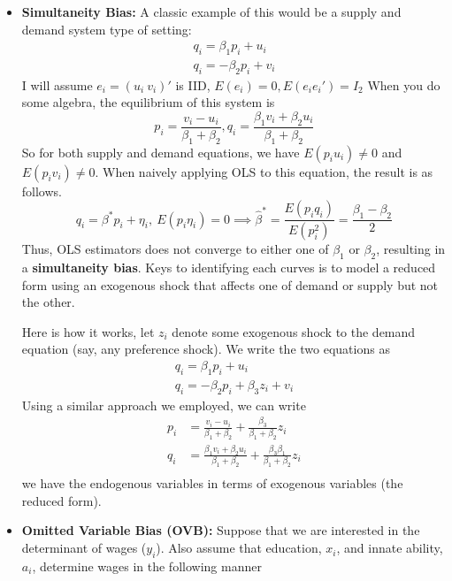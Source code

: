 \documentclass[12pt]{article}
\theoremstyle{definition}
\theoremstyle{property}
\theoremstyle{assumption}
\theoremstyle{example}
\theoremstyle{comment}
\newtheorem{comment}{Comment}[section]
\begin{document}
\begin{itemize}
\begin{mdframed}[backgroundcolor=yellow!5]
\begin{comment}[Comment on Measurement Errors]
\item If there is a measurement error in $y_i$, the only this it does is to change the component of $e_i$. Assuming all the old assumptions hold, this does not pose as much problem as having a measurement error in the regressor. 
\end{itemize}
\end{comment}
\end{mdframed}
\item \textbf{Simultaneity Bias: } A classic example of this would be a supply and demand system type of setting:
\begin{gather*}
q_i = \beta_1p_i+u_i \tag{Supply}\\
q_i = -\beta_2p_i+v_i \tag{Demand}
\end{gather*}
I will assume $e_i = (u_i \ v_i)'$ is IID, $E(e_i)=0, E(e_ie_i')=I_{2}$
When you do some algebra, the equilibrium of this system is 
\[
p_i = \frac{v_i-u_i}{\beta_1+\beta_2}, q_i = \frac{\beta_1v_i + \beta_2u_i}{\beta_1+\beta_2}
\]
So for both supply and demand equations, we have $E(p_iu_i)\neq0$ and $E(p_iv_i)\neq0$. When naively applying OLS to this equation, the result is as follows. 
\[
q_i=\beta^*p_i+\eta_i, \ E(p_i\eta_i)=0 \implies \hat{\beta}^*=\frac{E(p_iq_i)}{E(p_i^2)}=\frac{\beta_1-\beta_2}{2}
\]
Thus, OLS estimators does not converge to either one of $\beta_1$ or $\beta_2$, resulting in a \textbf{simultaneity bias}.  Keys to identifying each curves is to model a reduced form using an exogenous shock that affects one of demand or supply but not the other. 
\par
Here is how it works, let $z_i$ denote some exogenous shock to the demand equation (say, any preference shock). We write the two equations as 
\begin{gather*}
q_i = \beta_1p_i+u_i \tag{Supply}\\
q_i = -\beta_2p_i+\beta_3z_i+v_i \tag{Demand}
\end{gather*}
Using a similar approach we employed, we can write
\[
\begin{aligned}
p_i&=\frac{v_i-u_i}{\beta_1+\beta_2}+ \frac{\beta_3}{\beta_1+\beta_2}z_i\\
q_i&=\frac{\beta_1v_i + \beta_2u_i}{\beta_1+\beta_2}+\frac{\beta_3\beta_1}{\beta_1+\beta_2}z_i\\
\end{aligned}
\]
we have the endogenous variables in terms of exogenous variables (the reduced form). 
\item \textbf{Omitted Variable Bias (OVB): } Suppose that we are interested in the determinant of wages ($y_i$). Also assume that education, $x_i$, and innate ability,  $a_i$, determine wages in the following manner

\end{itemize}
\end{document}
